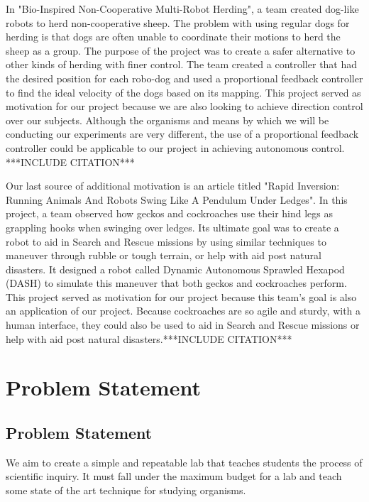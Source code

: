 \documentclass{article}
\begin{document}
\bigskip

\par In "Bio-Inspired Non-Cooperative Multi-Robot Herding", a team created dog-like robots to herd non-cooperative sheep. The problem with using regular dogs for herding is that dogs are often unable to coordinate their motions to herd the sheep as a group. The purpose of the project was to create a safer alternative to other kinds of herding with finer control. The team created a controller that had the desired position for each robo-dog and used a proportional feedback controller to find the ideal velocity of the dogs based on its mapping. This project served as motivation for our project because we are also looking to achieve direction control over our subjects. Although the organisms and means by which we will be conducting our experiments are very different, the use of a proportional feedback controller could be applicable to our project in achieving autonomous control. ***INCLUDE CITATION***

\bigskip

\par Our last source of additional motivation is an article titled "Rapid Inversion: Running Animals And Robots Swing Like A Pendulum Under Ledges". In this project, a team observed how geckos and cockroaches use their hind legs as grappling hooks when swinging over ledges. Its ultimate goal was to create a robot to aid in Search and Rescue missions by using similar techniques to maneuver through rubble or tough terrain, or help with aid post natural disasters. It designed a robot called Dynamic Autonomous Sprawled Hexapod (DASH) to simulate this maneuver that both geckos and cockroaches perform. This project served as motivation for our project because this team's goal is also an application of our project. Because cockroaches are so agile and sturdy, with a human interface, they could also be used to aid in Search and Rescue missions or help with aid post natural disasters.***INCLUDE CITATION***

\section{Problem Statement}

\subsection{Problem Statement}
\par We aim to create a simple and repeatable lab that teaches students the process of scientific inquiry. It must fall under the maximum budget for a lab and teach some state of the art technique for studying organisms.
\end{document}
